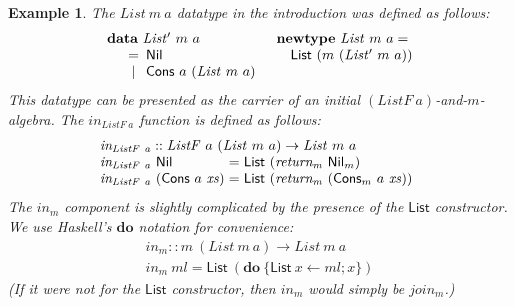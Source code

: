 \documentclass{jfp1}
\newtheorem{example}{Example}
\newcommand{\kw}[1]{\textbf{#1}}
\begin{document}
\begin{example}
  The $\mathit{List}~m~a$ datatype in the introduction was defined as
  follows:
  \begin{displaymath}
    \begin{array}{ll}
      \kw{data}~\mathit{List'}~m~a
      &
      \kw{newtype}~\mathit{List}~m~a = 
      \\
      \quad
      \begin{array}[t]{c@{\hspace{0.5em}}l}
        = & \mathsf{Nil} \\
        | & \mathsf{Cons}~a~(\mathit{List}~m~a) \\
      \end{array}
      &
      \quad \mathsf{List}~(m~(\mathit{List'}~m~a))
    \end{array}
  \end{displaymath}
  This datatype can be presented as the carrier of an initial
  $(\mathit{ListF}~a)$-and-$m$-algebra. The
  $\mathit{in_{\mathit{ListF}~a}}$ function is defined as follows:
  \begin{displaymath}
    \begin{array}{l}
      \mathit{in_{\mathit{ListF}~a}} :: \mathit{ListF}~a~(\mathit{List}~m~a) \to \mathit{List}~m~a \\
      \begin{array}{@{}l@{\hspace{0.3em}}c@{\hspace{0.3em}}l}
        \mathit{in_{\mathit{ListF}~a}}~\mathsf{Nil}&=&\mathsf{List}~(\mathit{return_m}~\mathsf{Nil}_m) \\
        \mathit{in_{\mathit{ListF}~a}}~(\mathsf{Cons}~a~\mathit{xs})&=&\mathsf{List}~(\mathit{return_m}~(\mathsf{Cons}_m~a~\mathit{xs})) \\
      \end{array}
    \end{array}
  \end{displaymath}
  The $\mathit{in_m}$ component is slightly complicated by the
  presence of the $\mathsf{List}$ constructor. We use Haskell's
  $\kw{do}$ notation for convenience:
  \begin{displaymath}
    \begin{array}{l}
      \mathit{in_m} :: m~(\mathit{List}~m~a) \to \mathit{List}~m~a \\
      \mathit{in_m}~\mathit{ml} = \mathsf{List}~(\kw{do}~\{ \mathsf{List}~x \leftarrow \mathit{ml}; x \})
    \end{array}
  \end{displaymath}
  (If it were not for the $\mathsf{List}$ constructor, then
  $\mathit{in_m}$ would simply be $\mathit{join_m}$.)


\end{example}
\end{document}
